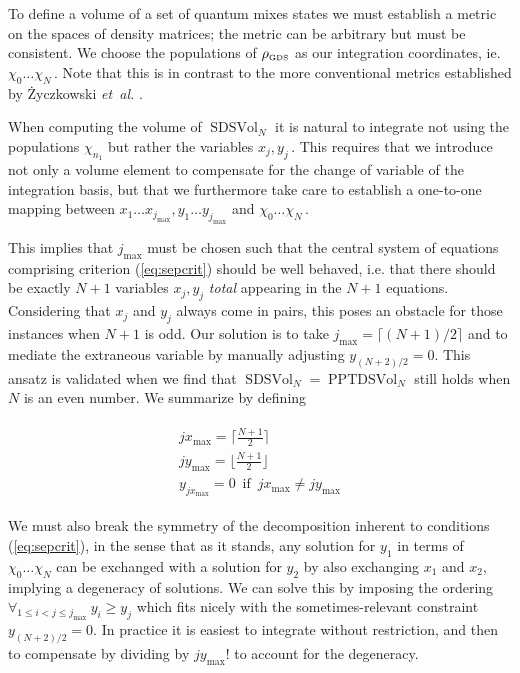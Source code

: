 \documentclass[
  12pt          %
  ,letterpaper  %
  ,center       %
  ,noupper      %
  ,english,fleqn]{uconnthesis}
\newcommand{\LeftEqns}[1]{\begin{fleqn}[\leftmargini minus \leftmargini]\begin{align}#1\end{align}\end{fleqn}}
\newcommand{\LeftEqn}[1]{\LeftEqns{\begin{split}#1\end{split}}}
\newcommand{\noeq}[1]{(\ref{#1})}
\begin{document}
To define a volume of a set of quantum mixes states we must establish a metric on the spaces of density matrices; the metric can be arbitrary but must be consistent. We choose the populations of $\rho_{\text{\tiny GDS}}$ as our integration coordinates, ie. $\chi_0\dots\chi_N\,$. Note that this is in contrast to the more conventional metrics established by Życzkowski \emph{et~al.} \cite{Zyczkowski98,Zyczkowski99,Zyczkowski01,ZyczkowskiHS,ZyczkowskiBures}.

When computing the volume of $\operatorname{SDSVol}_{N}$ it is natural to integrate not using the populations $\chi_{n_1}$ but rather the variables $x_j, y_j\,$. This requires that we introduce not only a volume element to compensate for the change of variable of the integration basis, but that we furthermore take care to establish a one-to-one mapping between $x_1\dots x_{j_\text{max}}, y_1 \dots y_{j_\text{max}}$ and $\chi_0\dots\chi_N\,$. 

This implies that $j_{\text{max}}$ must be chosen such that the central system of equations comprising criterion \noeq{eq:sepcrit} should be well behaved, i.e. that there should be exactly $N+1$ variables $x_j, y_j$ {\em total} appearing in the $N+1$ equations. Considering that $x_j$ and $y_j$ always come in pairs, this poses an obstacle for those instances when $N+1$ is odd. Our solution is to take $j_{\text{max}}=\lceil(N+1)/2\rceil$ and to mediate the extraneous variable by manually adjusting $y_{\left(N+2\right)/2}=0$. This ansatz is validated when we find that $\operatorname{SDSVol}_{N}=\operatorname{PPTDSVol}_{N}$ still holds when $N$ is an even number. We summarize by defining
\LeftEqn{\label{eq:jmaxdefs}
jx_{\text{max}}=\lceil\frac{N+1}{2}\rceil \\
jy_{\text{max}}=\lfloor\frac{N+1}{2}\rfloor \\
y_{jx_\text{max}} = 0 \,\text{ if }\,jx_\text{max} \neq jy_{\text{max}}
}

We must also break the symmetry of the decomposition inherent to conditions \noeq{eq:sepcrit}, in the sense that as it stands, any solution for $y_1$ in terms of $\chi_0\dots\chi_N$ can be exchanged with a solution for $y_2$ by also exchanging $x_1$ and $x_2$, implying a degeneracy of solutions. We can solve this by imposing the ordering $\forall_{1\leq i<j\leq j_\text{max}}\:y_i \geq y_j$ which fits nicely with the sometimes-relevant constraint $y_{\left(N+2\right)/2}=0$. In practice it is easiest to integrate without restriction, and then to compensate by dividing by $jy_{\text{max}}!$ to account for the degeneracy.
\end{document}

